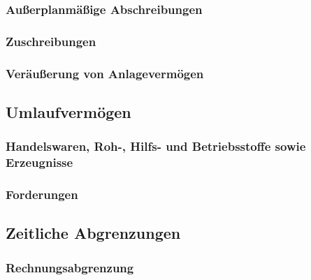 \documentclass[paper=a4, fontsize=11pt]{scrartcl}
\numberwithin{equation}{section}
\numberwithin{figure}{section}
\numberwithin{table}{section}
\begin{document}

\subsubsection{Außerplanmäßige Abschreibungen}


\subsubsection{Zuschreibungen}


\subsubsection{Veräußerung von Anlagevermögen}


\subsection{Umlaufvermögen}


\subsubsection{Handelswaren, Roh-, Hilfs- und Betriebsstoffe sowie Erzeugnisse}


\subsubsection{Forderungen}


\subsection{Zeitliche Abgrenzungen}


\subsubsection{Rechnungsabgrenzung}
\end{document}
